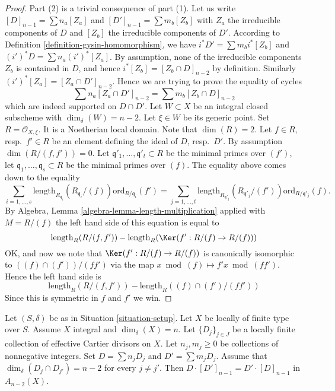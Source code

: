 \begin{proof}
Part (2) is a trivial consequence of part (1).
Let us write $[D]_{n - 1} = \sum n_a[Z_a]$ and
$[D']_{n - 1} = \sum m_b[Z_b]$ with $Z_a$ the irreducible
components of $D$ and $[Z_b]$ the irreducible
components of $D'$.
According to Definition \ref{definition-gysin-homomorphism},
we have $i^*D' = \sum m_b i^*[Z_b]$ and $(i')^*D = \sum n_a(i')^*[Z_a]$.
By assumption, none of the irreducible components $Z_b$
is contained in $D$, and hence $i^*[Z_b] = [Z_b\cap D]_{n - 2}$
by definition. Similarly $(i')^*[Z_a] = [Z_a \cap D']_{n - 2}$.
Hence we are trying to prove the equality of cycles
$$
\sum n_a[Z_a \cap D']_{n - 2} = \sum m_b[Z_b \cap D]_{n - 2}
$$
which are indeed supported on $D \cap D'$.
Let $W \subset X$ be an integral closed subscheme
with $\dim_\delta(W) = n - 2$. Let $\xi \in W$ be its generic point.
Set $R = \mathcal{O}_{X, \xi}$. It is a Noetherian local domain.
Note that $\dim(R) = 2$. Let $f \in R$, resp.\ $f' \in R$
be an element defining the ideal of $D$, resp.\ $D'$.
By assumption $\dim(R/(f, f')) = 0$. Let
$\mathfrak q'_1, \ldots, \mathfrak q'_t \subset R$ be the minimal
primes over $(f')$, let $\mathfrak q_1, \ldots, \mathfrak q_s \subset R$
be the minimal primes over $(f)$.
The equality above comes down to the equality
$$
\sum_{i = 1, \ldots, s}
\text{length}_{R_{\mathfrak q_i}}(R_{\mathfrak q_i}/(f))
\text{ord}_{R/\mathfrak q_i}(f')
=
\sum_{j = 1, \ldots, t}
\text{length}_{R_{\mathfrak q'_j}}(R_{\mathfrak q'_j}/(f'))
\text{ord}_{R/\mathfrak q'_j}(f).
$$
By Algebra, Lemma \ref{algebra-lemma-length-multiplication}
applied with $M = R/(f)$ the left hand side of
this equation is equal to
$$
\text{length}_R(R/(f, f'))
-
\text{length}_R(\Ker(f' : R/(f) \to R/(f)))
$$
OK, and now we note that
$\Ker(f' : R/(f) \to R/(f))$ is canonically isomorphic
to $((f) \cap (f'))/(ff')$ via the map $x \bmod (f) \mapsto
f'x \bmod (ff')$. Hence the left hand side is
$$
\text{length}_R(R/(f, f'))
-
\text{length}_R((f) \cap (f')/(ff'))
$$
Since this is symmetric in $f$ and $f'$ we win.
\end{proof}

\begin{lemma}
\label{lemma-commutativity-effective-Cartier-proper-intersection-infinite}
Let $(S, \delta)$ be as in Situation \ref{situation-setup}.
Let $X$ be locally of finite type over $S$.
Assume $X$ integral and $\dim_\delta(X) = n$.
Let $\{D_j\}_{j \in J}$ be a locally finite collection of
effective Cartier divisors on $X$. Let $n_j, m_j \geq 0$ be
collections of nonnegative integers. Set
$D = \sum n_j D_j$ and $D' = \sum m_j D_j$.
Assume that $\dim_\delta(D_j \cap D_{j'}) = n - 2$ for every
$j \not = j'$. Then $D \cdot [D']_{n - 1} = D' \cdot [D]_{n - 1}$ in
$A_{n - 2}(X)$.
\end{lemma}

